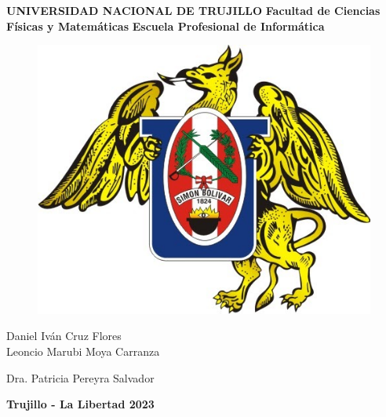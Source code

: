 \documentclass[a4paper, 12pt]{article}
\begin{document}
\begin{center}
 {\bf {\fontsize{16}{16.8}\selectfont UNIVERSIDAD NACIONAL DE TRUJILLO}}     
 \vskip 0.15cm
    {\bf{\fontsize{16}{16.8}\selectfont Facultad de Ciencias Físicas y Matemáticas}} 
\vskip 0.15cm
  {\bf{\fontsize{16}{16.8}\selectfont Escuela Profesional de Informática}}
\end{center}  

\begin{figure}[ht]
\begin{center}
\includegraphics[width=.3\textwidth]{unt}
\end{center}
\end{figure}

\vskip 2cm

\begin{center}
  { \bf {\fontsize{17}{20.4} \selectfont{ Desarrollo de un sistema BMS – IoT y su influencia en el \\ 
  \vskip 0.2cm control automatizado del consumo eléctrico basado en el\\
  \vskip 0.2cm protocolo MQTT para viviendas multifamiliares,\\
  \vskip 0.2cm Trujillo 2023.}}  } 

 
  \vskip 2cm
  { \bf {\fontsize{17}{20.4}}  }
  
 \vskip 0.25cm 
  
   Daniel Iván Cruz Flores \\
   Leoncio Marubi Moya Carranza
 
	   
  \vskip 1cm
  { \bf {\fontsize{17}{20.4} }  } 
 \vskip 0.25cm 
 
   Dra. Patricia Pereyra Salvador
  
\vskip 2cm


{\bf {\fontsize{14}{16.8}\selectfont Trujillo - La Libertad
\vskip 0.0cm
\hspace*{-0.2cm} 
\vskip 0.1cm
2023 }}
\end{center} 
\newpage
\end{document}
